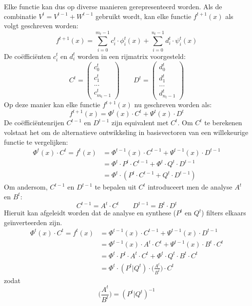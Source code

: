 \begin{enumerate}
{\begin{itemize}
			Elke functie kan dus op diverse manieren gerepresenteerd worden. Als de combinatie $V^t = V^{t - 1} + W^{t - 1}$ gebruikt wordt, kan elke functie $f^{t + 1}(x)$ als volgt geschreven worden:
			$$f^{t+1}(x) = \sum_{i=0}^{m_t - 1} c_i^t \cdot \phi^t_i(x) + \sum_{i=0}^{n_t - 1} d_i^t \cdot \psi^t_i(x)$$
			De coëfficiënten $c_i^t$ en $d_i^t$ worden in een rijmatrix voorgesteld:
		$$C^t = \begin{pmatrix} c_0^t \\ c_1^t \\ ... \\ c^t_{m_t - 1}\end{pmatrix}\qquad D^t = \begin{pmatrix} d_0^t \\ d_1^t \\ ... \\ d^t_{n_t - 1}\end{pmatrix}$$
			Op deze manier kan elke functie $f^{t + 1}(x)$ nu geschreven worden als:
			$$f^{t + 1}(x) = \Phi^t(x) \cdot C^t + \Psi^t(x) \cdot D^t$$
			De coëfficiëntenrijen $C^{t - 1}$ en $D^{t - 1}$ zijn equivalent met $C^t$. Om $C^t$ te berekenen volstaat het om de alternatieve ontwikkeling in basisvectoren van een willekeurige functie te vergelijken:
			\begin{equation*}
				\begin{split}
					\Phi^t(x) \cdot C^t = f^t(x) & = \Phi^{t-1}(x) \cdot C^{t-1} + \Psi^{t-1}(x) \cdot D^{t-1} \\
												 & = \Phi^{t} \cdot P^t \cdot C^{t-1} + \Phi^{t} \cdot Q^t \cdot D^{t-1} \\
												 & = \Phi^{t} \cdot (P^t\cdot C^{t - 1} + Q^t \cdot D^{t - 1})
				\end{split}
			\end{equation*}
			Om andersom, $C^{t - 1}$ en $D^{t - 1}$ te bepalen uit $C^t$ introduceert men de analyse $A^t$ en $B^t$:
			$$C^{t - 1} = A^t\cdot C^t\qquad D^{t - 1} = B^t\cdot D^t$$
			Hieruit kan afgeleidt worden dat de analyse en synthese ($P^t$ en $Q^t$) filters elkaars geïnverteerden zijn.
			\begin{equation*}
				\begin{split}
					\Phi^t(x) \cdot C^t = f^t(x) & = \Phi^{t-1}(x) \cdot C^{t-1} + \Psi^{t-1}(x) \cdot D^{t-1} \\
												 & = \Phi^{t-1}(x) \cdot A^t \cdot C^t + \Psi^{t-1}(x) \cdot B^t \cdot C^t \\
												 & = \Phi^{t} \cdot P^t \cdot A^t \cdot C^t + \Phi^{t} \cdot Q^t \cdot B^t \cdot C^t \\
												 & = \Phi^{t} \cdot (P^t  | Q^t) \cdot \bigg(\frac{A^t}{B^t}\bigg) \cdot C^t				
				\end{split}
			\end{equation*}
			zodat
			$$\bigg(\frac{A^t}{B^t}\bigg) = (P^t  | Q^t)^{-1}$$


\end{itemize}}
\end{enumerate}
